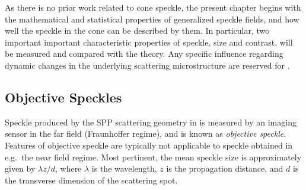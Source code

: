 As there is no prior work related to cone speckle, the present chapter begins
with the mathematical and statistical properties of generalized speckle
fields, and how well the speckle in the cone can be described by them.  In
particular, two important important characteristic properties of speckle, size
and contrast, will be measured and compared with the theory.  Any specific
influence regarding dynamic changes in the underlying scattering
microstructure are reserved for .

\subsection{Objective Speckles}
Speckle produced by the SPP scattering geometry in
 is measured by an imaging sensor in the far
field (Fraunhoffer regime), and is known as \textit{objective speckle}.
Features of objective speckle are typically not applicable to speckle obtained
in e.g.\ the near field regime.  Most pertinent, the mean speckle size is
approximately given by $\lambda z/d$, where $\lambda$ is the wavelength, $z$
is the propagation distance, and $d$ is the transverse dimension of the
scattering spot\cite{dainty1975laser}.
